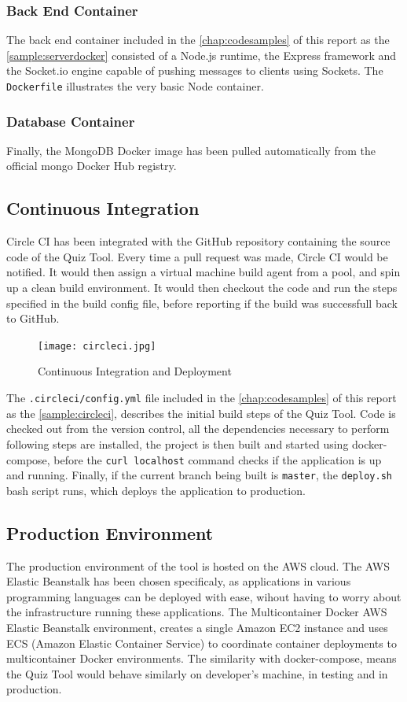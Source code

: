\subsubsection{Back End Container}
The back end container included in the \autoref{chap:codesamples} of this report
as the \autoref{sample:serverdocker} consisted of a Node.js runtime, the Express framework and the Socket.io
engine capable of pushing messages to clients using Sockets. The \texttt{Dockerfile} illustrates
the very basic Node container.

\subsubsection{Database Container}
Finally, the MongoDB Docker image has been pulled automatically from the official mongo
Docker Hub registry\cite{36}.

\subsection{Continuous Integration}
Circle CI has been integrated with the GitHub repository containing the source code of the
Quiz Tool. Every time a pull request was made, Circle CI would be notified. It would then
assign a virtual machine build agent from a pool, and spin up a clean build environment.
It would then checkout the code and run the steps specified in the build config file, before
reporting if the build was successfull back to GitHub.

\begin{figure}[ht]
    \centering
    \texttt{[image: circleci.jpg]}
    \caption{Continuous Integration and Deployment}
    \label{fig:ci}
\end{figure}

The \texttt{.circleci/config.yml} file included in the \autoref{chap:codesamples} of this report
as the \autoref{sample:circleci}, describes the initial build steps of the Quiz Tool.
Code is checked out from the version control, all the dependencies necessary to perform following
steps are installed, the project is then built and started using docker-compose, before the
\texttt{curl localhost} command checks if the application is up and running. Finally, if
the current branch being built is \texttt{master}, the \texttt{deploy.sh} bash script runs, which
deploys the application to production.

\subsection{Production Environment}
The production environment of the tool is hosted on the AWS cloud. The AWS Elastic Beanstalk
has been chosen specificaly, as applications in
various programming languages can be deployed with ease, wihout having to worry about
the infrastructure running these applications\cite{37}. The Multicontainer Docker AWS Elastic
Beanstalk\cite{38} environment, creates a single Amazon EC2\cite{39}
instance and uses ECS (Amazon Elastic Container Service)\cite{40} to coordinate container deployments to
multicontainer Docker environments. The similarity with docker-compose, means the Quiz Tool
would behave similarly on developer's machine, in testing and in production.

